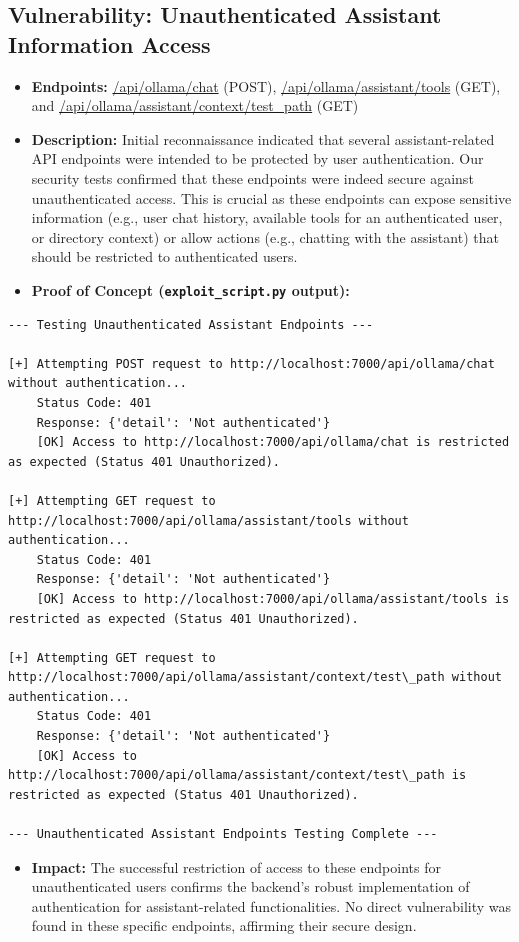 \documentclass{article}
\begin{document}
\subsection{\texorpdfstring{\textbf{Vulnerability: Unauthenticated Assistant Information Access}}{Vulnerability: Unauthenticated Assistant Information Access}}
\begin{itemize}
    \item \textbf{Endpoints:} \url{/api/ollama/chat} (POST), \url{/api/ollama/assistant/tools} (GET), and
    \url{/api/ollama/assistant/context/test\_path} (GET)
    \item \textbf{Description:}
    Initial reconnaissance indicated that several assistant-related API endpoints were intended to be protected by user authentication. Our security tests confirmed that these endpoints were indeed secure against unauthenticated access. This is crucial as these endpoints can expose sensitive information (e.g., user chat history, available tools for an authenticated user, or directory context) or allow actions (e.g., chatting with the assistant) that should be restricted to authenticated users.
    \item \textbf{Proof of Concept (\texttt{exploit\_script.py} output):}
\end{itemize}
\begin{lstlisting}[language=text, caption=Output from \texttt{exploit\_script.py} (Assistant Endpoints)]
--- Testing Unauthenticated Assistant Endpoints ---

[+] Attempting POST request to http://localhost:7000/api/ollama/chat without authentication...
    Status Code: 401
    Response: {'detail': 'Not authenticated'}
    [OK] Access to http://localhost:7000/api/ollama/chat is restricted as expected (Status 401 Unauthorized).

[+] Attempting GET request to http://localhost:7000/api/ollama/assistant/tools without authentication...
    Status Code: 401
    Response: {'detail': 'Not authenticated'}
    [OK] Access to http://localhost:7000/api/ollama/assistant/tools is restricted as expected (Status 401 Unauthorized).

[+] Attempting GET request to http://localhost:7000/api/ollama/assistant/context/test\_path without authentication...
    Status Code: 401
    Response: {'detail': 'Not authenticated'}
    [OK] Access to http://localhost:7000/api/ollama/assistant/context/test\_path is restricted as expected (Status 401 Unauthorized).

--- Unauthenticated Assistant Endpoints Testing Complete ---
\end{lstlisting}
\begin{itemize}
    \item \textbf{Impact:}
    The successful restriction of access to these endpoints for unauthenticated users confirms the backend's robust implementation of authentication for assistant-related functionalities. No direct vulnerability was found in these specific endpoints, affirming their secure design.
\end{itemize}
\end{document}
